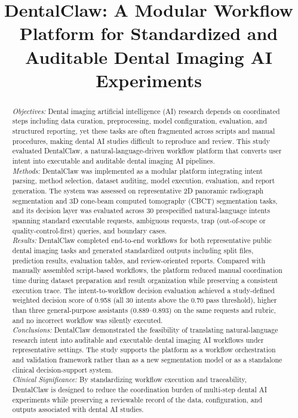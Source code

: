 \documentclass[final,5p,times,twocolumn]{elsarticle}
\begin{document}
\begin{frontmatter}

\title{DentalClaw: A Modular Workflow Platform for Standardized and Auditable Dental Imaging AI Experiments}

\begin{abstract}
\textit{Objectives:} Dental imaging artificial intelligence (AI) research depends on coordinated steps including data curation, preprocessing, model configuration, evaluation, and structured reporting, yet these tasks are often fragmented across scripts and manual procedures, making dental AI studies difficult to reproduce and review. This study evaluated DentalClaw, a natural-language-driven workflow platform that converts user intent into executable and auditable dental imaging AI pipelines.\\
\textit{Methods:} DentalClaw was implemented as a modular platform integrating intent parsing, method selection, dataset auditing, model execution, evaluation, and report generation. The system was assessed on representative 2D panoramic radiograph segmentation and 3D cone-beam computed tomography (CBCT) segmentation tasks, and its decision layer was evaluated across 30 prespecified natural-language intents spanning standard executable requests, ambiguous requests, trap (out-of-scope or quality-control-first) queries, and boundary cases.\\
\textit{Results:} DentalClaw completed end-to-end workflows for both representative public dental imaging tasks and generated standardized outputs including split files, prediction results, evaluation tables, and review-oriented reports. Compared with manually assembled script-based workflows, the platform reduced manual coordination time during dataset preparation and result organization while preserving a consistent execution trace. The intent-to-workflow decision evaluation achieved a study-defined weighted decision score of 0.958 (all 30 intents above the 0.70 pass threshold), higher than three general-purpose assistants (0.889--0.893) on the same requests and rubric, and no incorrect workflow was silently executed.\\
\textit{Conclusions:} DentalClaw demonstrated the feasibility of translating natural-language research intent into auditable and executable dental imaging AI workflows under representative settings. The study supports the platform as a workflow orchestration and validation framework rather than as a new segmentation model or as a standalone clinical decision-support system.\\
\textit{Clinical Significance:} By standardizing workflow execution and traceability, DentalClaw is designed to reduce the coordination burden of multi-step dental AI experiments while preserving a reviewable record of the data, configuration, and outputs associated with dental AI studies.
\end{abstract}


\end{frontmatter}
\end{document}
